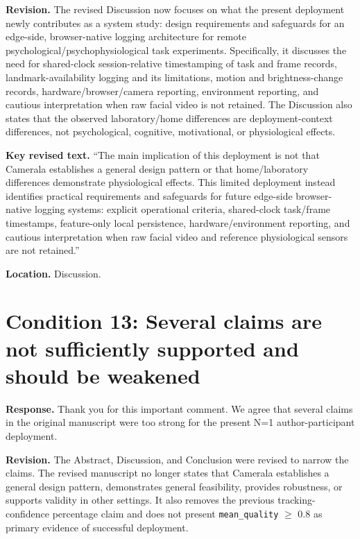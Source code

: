 \documentclass[11pt]{article}
\newcommand{\condition}[2]{\section*{Condition #1: #2}}
\begin{document}
\textbf{Revision.}
The revised Discussion now focuses on what the present deployment newly contributes as a system study: design requirements and safeguards for an edge-side, browser-native logging architecture for remote psychological/psychophysiological task experiments.
Specifically, it discusses the need for shared-clock session-relative timestamping of task and frame records, landmark-availability logging and its limitations, motion and brightness-change records, hardware/browser/camera reporting, environment reporting, and cautious interpretation when raw facial video is not retained.
The Discussion also states that the observed laboratory/home differences are deployment-context differences, not psychological, cognitive, motivational, or physiological effects.

\textbf{Key revised text.}
``The main implication of this deployment is not that Camerala establishes a general design pattern or that home/laboratory differences demonstrate physiological effects.
This limited deployment instead identifies practical requirements and safeguards for future edge-side browser-native logging systems: explicit operational criteria, shared-clock task/frame timestamps, feature-only local persistence, hardware/environment reporting, and cautious interpretation when raw facial video and reference physiological sensors are not retained.''

\textbf{Location.}
Discussion.

\condition{13}{Several claims are not sufficiently supported and should be weakened}
\textbf{Response.}
Thank you for this important comment.
We agree that several claims in the original manuscript were too strong for the present N=1 author-participant deployment.

\textbf{Revision.}
The Abstract, Discussion, and Conclusion were revised to narrow the claims.
The revised manuscript no longer states that Camerala establishes a general design pattern, demonstrates general feasibility, provides robustness, or supports validity in other settings.
It also removes the previous tracking-confidence percentage claim and does not present \texttt{mean\_quality} $\geq$ 0.8 as primary evidence of successful deployment.
\end{document}
